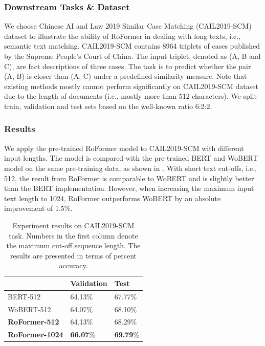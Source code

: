 \documentclass{article}
\begin{document}
\subsubsection{Downstream Tasks \& Dataset}
We choose Chinese AI and Law 2019 Similar Case Matching (CAIL2019-SCM)\cite{cail2019scm} dataset to illustrate the ability of RoFormer in dealing with long texts, i.e., semantic text matching. CAIL2019-SCM contains 8964 triplets of cases published by the Supreme People's Court of China. The input triplet, denoted as (A, B and C), are fact descriptions of three cases. The task is to predict whether the pair (A, B) is closer than (A, C) under a predefined similarity measure. Note that existing methods mostly cannot perform significantly on CAIL2019-SCM dataset due to the length of documents (i.e., mostly more than 512 characters). We split train, validation and test sets based on the well-known  ratio  6:2:2.

\subsubsection{Results} 
We apply the pre-trained RoFormer model to CAIL2019-SCM with different input lengths. The model is compared with the pre-trained BERT and WoBERT model on the same pre-training data,  as shown in . With short text cut-offs, i.e., 512, the result from RoFormer is comparable to WoBERT and is slightly better than the BERT implementation. However, when increasing the maximum input text length to 1024, RoFormer outperforms WoBERT by an absolute improvement of 1.5\%. 

\begin{table}[hbt]
	\caption{Experiment results on CAIL2019-SCM task. Numbers in the first column denote the maximum cut-off sequence length. The results are presented in terms of percent accuracy.}
	\label{tb:roformer-cail2019}
	\centering
	\begin{tabular}{lll}
		\toprule
		\makecell[c]{Model} & Validation & Test \\ 
		\midrule
		BERT-512 & 64.13\% & 67.77\% \\ 
		WoBERT-512 & 64.07\% & 68.10\% \\
		\textbf{RoFormer-512} & 64.13\% & 68.29\% \\
		\textbf{RoFormer-1024} & \textbf{66.07}\% & \textbf{69.79}\% \\ 
		\bottomrule
	\end{tabular}
\end{table}
\end{document}

